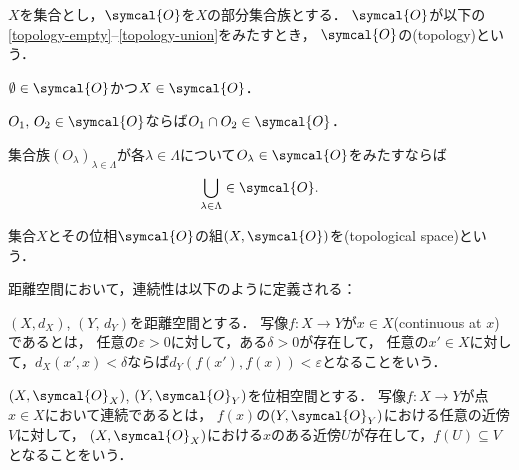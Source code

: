 \documentclass[../main.tex]{subfiles}
\begin{document}

\begin{thmbox}
\begin{definition}
\(X\)を集合とし，\(\symcal{O}\)を\(X\)の部分集合族とする．
\(\symcal{O}\)が以下の\ref{topology-empty}--\ref{topology-union}をみたすとき，
\(\symcal{O}\)の(topology)という．
\begin{conditions}
    \item\label{topology-empty} \(\emptyset \in \symcal{O}\)かつ\(X \in \symcal{O}\)．
    \item\label{topology-intersection} \(O_1,\,O_2 \in \symcal{O}\)ならば\(O_1 \cap O_2 \in \symcal{O}\)．
    \item\label{topology-union} 集合族\({(O_\lambda)}_{\lambda \in \Lambda}\)が各\(\lambda \in \Lambda\)について\(O_\lambda \in \symcal{O}\)をみたすならば
        \begin{align}
            \bigcup_{\lambda \in \Lambda} \in \symcal{O}.
        \end{align}
\end{conditions}
集合\(X\)とその位相\(\symcal{O}\)の組\((X, \symcal{O})\)を(topological space)という．
\end{definition}
\end{thmbox}

距離空間において，連続性は以下のように定義される：
\begin{thmbox}
\begin{definition}
\((X, d_{X})\), \((Y,\,d_{Y})\)を距離空間とする．
写像\(f\colon X \to Y\)が\(x \in X\)(continuous at \(x\))であるとは，
任意の\(\varepsilon > 0\)に対して，ある\(\delta > 0\)が存在して，
任意の\(x' \in X\)に対して，\(d_{X}(x', x) < \delta\)ならば\(d_{Y}(f(x'), f(x)) < \varepsilon\)となることをいう．
\end{definition}
\end{thmbox}

\begin{thmbox}
\begin{definition}
\((X, \symcal{O}_{X})\), \((Y, \symcal{O}_{Y})\)を位相空間とする．
写像\(f\colon X \to Y\)が点\(x \in X\)において連続であるとは，
\(f(x)\)の\((Y, \symcal{O}_{Y})\)における任意の近傍\(V\)に対して，
\((X, \symcal{O}_{X})\)における\(x\)のある近傍\(U\)が存在して，\(f(U) \subseteq V\)となることをいう．
\end{definition}
\end{thmbox}
\end{document}
